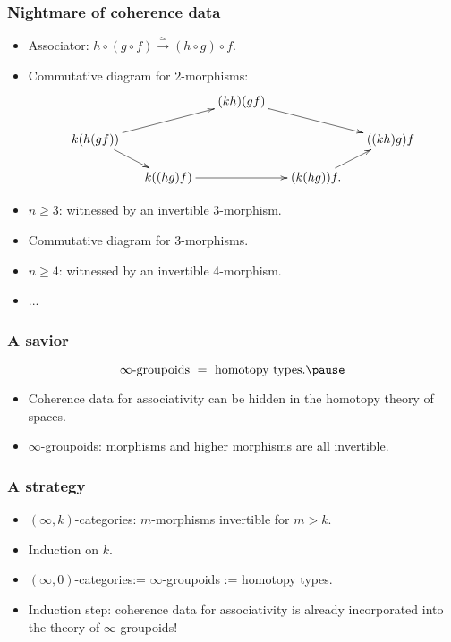 \begin{frame}
	\frametitle{Nightmare of coherence data}

	\begin{itemize}
		\item
			\alert{Associator}: $h\circ (g\circ f) \xrightarrow{\simeq} (h\circ g) \circ f$. \pause
		\item
			Commutative diagram for $2$-morphisms:
			\[
			\xymatrixrowsep{0.2in}
			\xymatrixcolsep{0.2in}
	\xymatrix{
		& & (kh)(gf) \ar[rrd] \\
		k(h(gf)) \ar[rru] \ar[rd]
		& & & & ((kh)g)f \\
		& k((hg)f) \ar[rr]
		& & (k(hg))f. \ar[ru]
	}
		\] \pause
		\item
			$n\ge 3$: \alert{witnessed} by an invertible $3$-morphism. \pause
		\item
			Commutative diagram for $3$-morphisms. \pause
		\item
			$n\ge 4$: \alert{witnessed} by an invertible $4$-morphism. \pause
		\item
			...
	\end{itemize}

\end{frame}

\begin{frame}
	\frametitle{A savior}

	\begin{slog}
		 
		 \[
		 	\infty\mbox{-groupoids }= \mbox{ homotopy types.}\pause
		 \]
	\end{slog}

	\begin{itemize}
		\item<3->
			Coherence data for associativity can be \alert{hidden} in the homotopy theory of spaces.
		\item<2->
			\alert{$\infty$-groupoids}: morphisms and higher morphisms are all invertible.  \pause
		
	\end{itemize}

\end{frame}

\begin{frame}
	\frametitle{A strategy}
	\begin{itemize}
		\item
			\alert{$(\infty,k)$-categories}: $m$-morphisms invertible for $m>k$. \pause
		\item
			Induction on $k$. \pause
		\item
			\alert{$(\infty,0)$-categories}:= $\infty$-groupoids := homotopy types. \pause
		\item
			Induction step: coherence data for associativity is already incorporated into the theory of $\infty$-groupoids!
		
	\end{itemize}

\end{frame}

